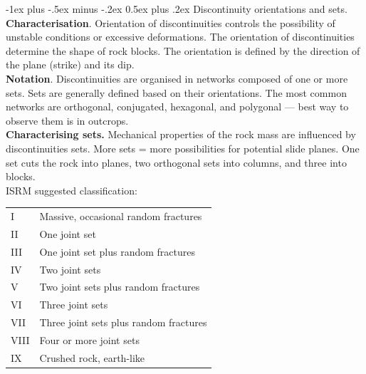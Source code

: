 \documentclass[10pt,landscape,a4paper]{article}
\makeatletter
\renewcommand{\section}{\@startsection{section}{1}{0mm}%
	{-1ex plus -.5ex minus -.2ex}%
	{0.5ex plus .2ex}%
	{\normalfont\large\bfseries}}
\makeatother
\begin{document}
\begin{multicols}{3}
	\section{Discontinuity orientations and sets.}
	\textbf{Characterisation}.
	Orientation of discontinuities controls the possibility of unstable conditions or excessive deformations.
	The orientation of discontinuities determine the shape of rock blocks.
	The orientation is defined by the direction of the plane (strike) and its dip.\\
	\textbf{Notation}.
	Discontinuities are organised in networks composed of one or more sets.
	Sets are generally defined based on their orientations.
	The most common networks are orthogonal, conjugated, hexagonal, and polygonal --- best way to observe them is in outcrops.\\
	\textbf{Characterising sets.}
	Mechanical properties of the rock mass are influenced by discontinuities sets. More sets = more possibilities for potential slide planes.
	One set cuts the rock into planes, two orthogonal sets into columns, and three into blocks.\\
	ISRM suggested classification:
	\begin{table}[H]\scriptsize\centering\begin{tabular}{ll}
			I    & Massive, occasional random fractures   \\
			II   & One joint set                          \\
			III  & One joint set plus random fractures    \\
			IV   & Two joint sets                         \\
			V    & Two joint sets plus random fractures   \\
			VI   & Three joint sets                       \\
			VII  & Three joint sets plus random fractures \\
			VIII & Four or more joint sets                \\
			IX   & Crushed rock, earth-like               \\
		\end{tabular}\end{table}
	

\end{multicols}
\end{document}
